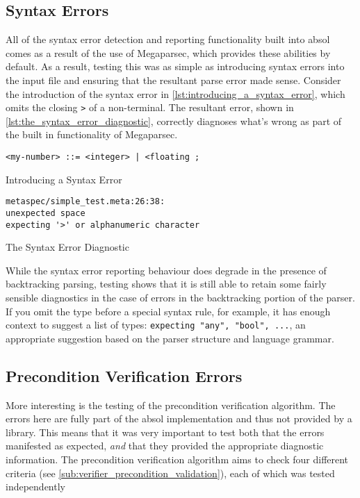 \subsection{Syntax Errors} %
\label{sub:syntax_errors}
All of the syntax error detection and reporting functionality built into \gls{absol} comes as a result of the use of Megaparsec, which provides these abilities by default.
As a result, testing this was as simple as introducing syntax errors into the input file and ensuring that the resultant parse error made sense. 
Consider the introduction of the syntax error in \autoref{lst:introducing_a_syntax_error}, which omits the closing \texttt{>} of a non-terminal. 
The resultant error, shown in \autoref{lst:the_syntax_error_diagnostic}, correctly diagnoses what's wrong as part of the built in functionality of Megaparsec. 

\begin{listing}[!htb]
\begin{verbatim}
<my-number> ::= <integer> | <floating ;
\end{verbatim}
\caption{Introducing a Syntax Error}
\label{lst:introducing_a_syntax_error}
\end{listing}

\begin{listing}[!htb]
\begin{verbatim}
metaspec/simple_test.meta:26:38:
unexpected space
expecting '>' or alphanumeric character
\end{verbatim}
\caption{The Syntax Error Diagnostic}
\label{lst:the_syntax_error_diagnostic}
\end{listing}

While the syntax error reporting behaviour does degrade in the presence of backtracking parsing, testing shows that it is still able to retain some fairly sensible diagnostics in the case of errors in the backtracking portion of the parser. 
If you omit the type before a special syntax rule, for example, it has enough context to suggest a list of types: \texttt{expecting "any", "bool", ...}, an appropriate suggestion based on the parser structure and language grammar.


\subsection{Precondition Verification Errors} %
\label{sub:precondition_verification_errors}
More interesting is the testing of the precondition verification algorithm.
The errors here are fully part of the \gls{absol} implementation and thus not provided by a library. 
This means that it was very important to test both that the errors manifested as expected, \textit{and} that they provided the appropriate diagnostic information.
The precondition verification algorithm aims to check four different criteria (see \autoref{sub:verifier_precondition_validation}), each of which was tested independently


